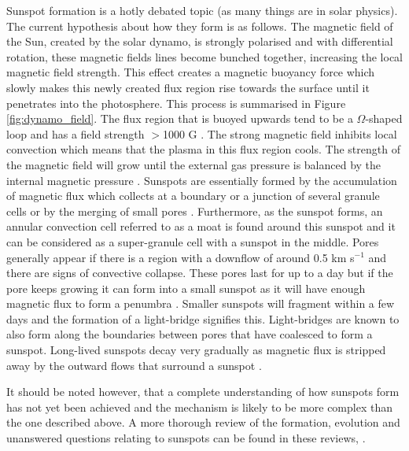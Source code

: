     Sunspot formation is a hotly debated topic (as many things are in solar physics).
    The current hypothesis about how they form is as follows.
    The magnetic field of the Sun, created by the solar dynamo, is strongly polarised and with differential rotation, these magnetic fields lines become bunched together, increasing the local magnetic field strength.
    This effect creates a magnetic buoyancy force which slowly makes this newly created flux region rise towards the surface until it penetrates into the photosphere.
    This process is summarised in Figure \ref{fig:dynamo_field}.
    The flux region that is buoyed upwards tend to be a $\Omega$-shaped loop and has a field strength $>$1000 G \citep{stix2004sun,2014SoPh..289.3351T}.
    The strong magnetic field inhibits local convection which means that the plasma in this flux region cools. 
    The strength of the magnetic field will grow until the external gas pressure is balanced by the internal magnetic pressure \citep{2014masu.book.....P}.
    Sunspots are essentially formed by the accumulation of magnetic flux which collects at a boundary or a junction of several granule cells or by the merging of small pores \citep{1974MNRAS.169...35M}.
    Furthermore, as the sunspot forms, an annular convection cell referred to as a moat is found around this sunspot and it can be considered as a super-granule cell with a sunspot in the middle.
    Pores generally appear if there is a region with a downflow of around 0.5 km s$^{-1}$ and there are signs of convective collapse.
    These pores last for up to a day but if the pore keeps growing it can form into a small sunspot as it will have enough magnetic flux to form a penumbra \citep{2010A&A...512L...1S}.
    Smaller sunspots will fragment within a few days and the formation of a light-bridge signifies this.
    Light-bridges are known to also form along the boundaries between pores that have coalesced to form a sunspot.
    Long-lived sunspots decay very gradually as magnetic flux is stripped away by the outward flows that surround a sunspot \citep{2002AN....323..342M,2008ApJ...686.1447K}.
                          
    It should be noted however, that a complete understanding of how sunspots form has not yet been achieved and the mechanism is likely to be more complex than the one described above.
    A more thorough review of the formation, evolution and unanswered questions relating to sunspots can be found in these reviews, \cite{SAO,2008sust.book.....T,lrsp-2011-3}.

